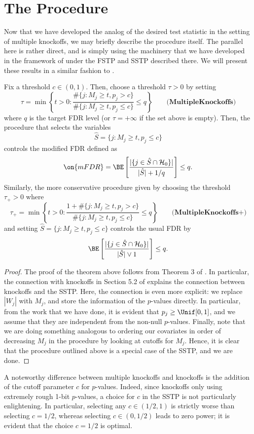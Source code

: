 \documentclass[11pt,reqno]{report}
\theoremstyle{definition}
\numberwithin{equation}{section}
\begin{document}
\section{The Procedure}
Now that we have developed the analog of the desired test statistic in the setting of multiple knockoffs, we may briefly describe the procedure itself. The parallel here is rather direct, and is simply using the machinery that we have developed in the framework of \cite{knockoffs} under the FSTP and SSTP described there. We will present these results in a similar fashion to \cite{panning}.
\begin{theorem}
Fix a threshold $c \in (0,1)$. Then, choose a threshold $\tau > 0$ by setting
\[ \tau = \min \left\{ t > 0 : \frac{\# \{ j : M_j \geq t, p_j > c \}}{\# \{ j : M_j \geq t, p_j \leq c \}} \leq q \right\} \qquad \textbf{(MultipleKnockoffs)} \] where $q$ is the target FDR level (or $\tau = + \infty$ if the set above is empty). Then, the procedure that selects the variables
\[ \hat{S} = \{ j : M_j \geq t, p_j \leq c \} \] controls the modified FDR defined as
\[ \on{mFDR} = \BE\left[ \frac{|\{ j \in \hat{S} \cap \mathcal{H}_0 \}|}{|\hat{S}|+ 1 / q} \right] \leq q. \] Similarly, the more conservative procedure given by choosing the threshold $\tau_+ > 0$ where
\[ \tau_+ = \min \left\{ t > 0 : \frac{1 + \# \{ j : M_j \geq t, p_j > c \}}{\# \{ j : M_j \geq t, p_j \leq c \}} \leq q \right\} \qquad \textbf{(MultipleKnockoffs+)} \] and setting $\hat{S} = \{ j : M_j \geq t, p_j \leq c \}$ controls the usual FDR by
\[ \BE\left[ \frac{|\{ j \in \hat{S} \cap \mathcal{H}_0 \}|}{|\hat{S}| \vee 1} \right] \leq q. \]
\end{theorem}
\begin{proof}
The proof of the theorem above follows from Theorem 3 of \cite{knockoffs}. In particular, the connection with knockoffs in Section 5.2 of \cite{knockoffs} explains the connection between knockoffs and the SSTP. Here, the connection is even more explicit: we replace $|W_j|$ with $M_j$, and store the information of the $p$-values directly. In particular, from the work that we have done, it is evident that $p_j \geq \Unif[0,1]$, and we assume that they are independent from the non-null $p$-values. Finally, note that we are doing something analogous to ordering our covariates in order of decreasing $M_j$ in the procedure by looking at cutoffs for $M_j$. Hence, it is clear that the procedure outlined above is a special case of the SSTP, and we are done.
\end{proof}
A noteworthy difference between multiple knockoffs and knockoffs is the addition of the cutoff parameter $c$ for $p$-values. Indeed, since knockoffs only using extremely rough 1-bit $p$-values, a choice for $c$ in the SSTP is not particularly enlightening. In particular, selecting any $c \in (1/2, 1)$ is strictly worse than selecting $c = 1/2$, whereas selecting $c \in (0, 1/2)$ leads to zero power; it is evident that the choice $c = 1/2$ is optimal.
\end{document}
